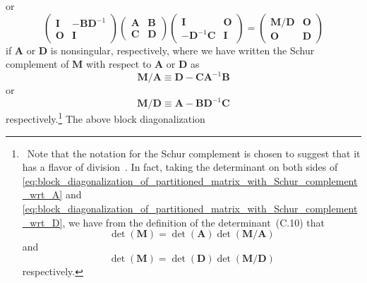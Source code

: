 \documentclass[12pt,a4paper]{article}
\begin{document}
or
\begin{equation}
\begin{pmatrix}
\mathbf{I} & -\mathbf{B}\mathbf{D}^{-1} \\
\mathbf{O} & \mathbf{I}
\end{pmatrix}
\begin{pmatrix}
\mathbf{A} & \mathbf{B} \\
\mathbf{C} & \mathbf{D}
\end{pmatrix}
\begin{pmatrix}
\mathbf{I} & \mathbf{O} \\
-\mathbf{D}^{-1}\mathbf{C} & \mathbf{I}
\end{pmatrix}
=
\begin{pmatrix}
\mathbf{M}/\mathbf{D} & \mathbf{O} \\
\mathbf{O} & \mathbf{D}
\end{pmatrix}
\label{eq:block_diagonalization_of_partitioned_matrix_with_Schur_complement_wrt_D}
\end{equation}
if $\mathbf{A}$ or $\mathbf{D}$ is nonsingular, respectively,
where we have written the Schur complement of $\mathbf{M}$ with respect to
$\mathbf{A}$ or $\mathbf{D}$ as
\begin{equation}
\mathbf{M}/\mathbf{A} \equiv \mathbf{D} - \mathbf{C}\mathbf{A}^{-1}\mathbf{B}
\label{eq:Schur_complement_of_M_wrt_A}
\end{equation}
or
\begin{equation}
\mathbf{M}/\mathbf{D} \equiv \mathbf{A} - \mathbf{B}\mathbf{D}^{-1}\mathbf{C}
\label{eq:Schur_complement_of_M_wrt_D}
\end{equation}
respectively.\footnote{\
Note that the notation for the Schur complement is chosen to suggest that
it has a flavor of division~\citep{Minka:OldNewMatrixAlgebra}.
In fact, taking the determinant on both sides of
\eqref{eq:block_diagonalization_of_partitioned_matrix_with_Schur_complement_wrt_A} and
\eqref{eq:block_diagonalization_of_partitioned_matrix_with_Schur_complement_wrt_D},
we have from the definition of the determinant~(C.10) that
\begin{equation}
\operatorname{det}(\mathbf{M}) =
\operatorname{det}(\mathbf{A}) \operatorname{det}(\mathbf{M}/\mathbf{A})
\end{equation}
and
\begin{equation}
\operatorname{det}(\mathbf{M}) =
\operatorname{det}(\mathbf{D}) \operatorname{det}(\mathbf{M}/\mathbf{D})
\end{equation}
respectively.}
The above block diagonalization
\end{document}
